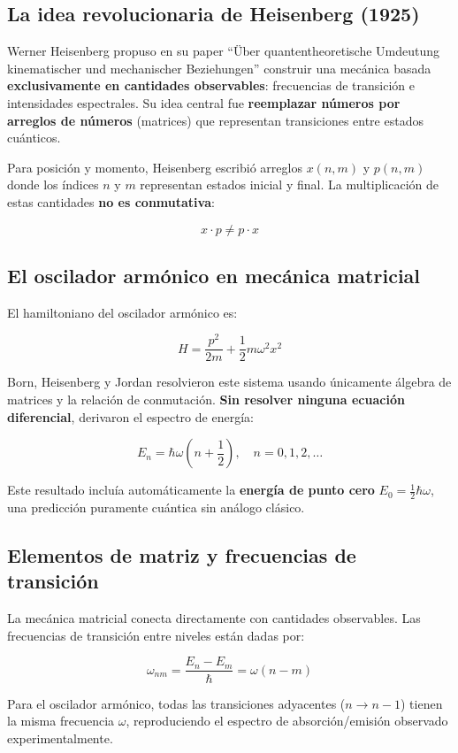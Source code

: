 \documentclass[11pt,a4paper,spanish]{book}
\begin{document}
\subsection*{La idea revolucionaria de Heisenberg (1925)}

Werner Heisenberg propuso en su paper ``Über quantentheoretische Umdeutung kinematischer und mechanischer Beziehungen'' \cite{heisenberg1925} construir una mecánica basada \textbf{exclusivamente en cantidades observables}: frecuencias de transición e intensidades espectrales. Su idea central fue \textbf{reemplazar números por arreglos de números} (matrices) que representan transiciones entre estados cuánticos.

Para posición y momento, Heisenberg escribió arreglos $x(n,m)$ y $p(n,m)$ donde los índices $n$ y $m$ representan estados inicial y final. La multiplicación de estas cantidades \textbf{no es conmutativa}:

\[
x \cdot p \neq p \cdot x
\]


\subsection*{El oscilador armónico en mecánica matricial}

El hamiltoniano del oscilador armónico es:

\[
H = \frac{p^2}{2m} + \frac{1}{2}m\omega^2 x^2
\]

Born, Heisenberg y Jordan \cite{bornheisenberg1926} resolvieron este sistema usando únicamente álgebra de matrices y la relación de conmutación. \textbf{Sin resolver ninguna ecuación diferencial}, derivaron el espectro de energía:

\[
E_n = \hbar\omega\left(n + \frac{1}{2}\right), \quad n = 0, 1, 2, \ldots
\]

Este resultado incluía automáticamente la \textbf{energía de punto cero} $E_0 = \frac{1}{2}\hbar\omega$, una predicción puramente cuántica sin análogo clásico.

\subsection*{Elementos de matriz y frecuencias de transición}

La mecánica matricial conecta directamente con cantidades observables. Las frecuencias de transición entre niveles están dadas por:

\[
\omega_{nm} = \frac{E_n - E_m}{\hbar} = \omega(n - m)
\]

Para el oscilador armónico, todas las transiciones adyacentes ($n \to n-1$) tienen la misma frecuencia $\omega$, reproduciendo el espectro de absorción/emisión observado experimentalmente.
\end{document}
